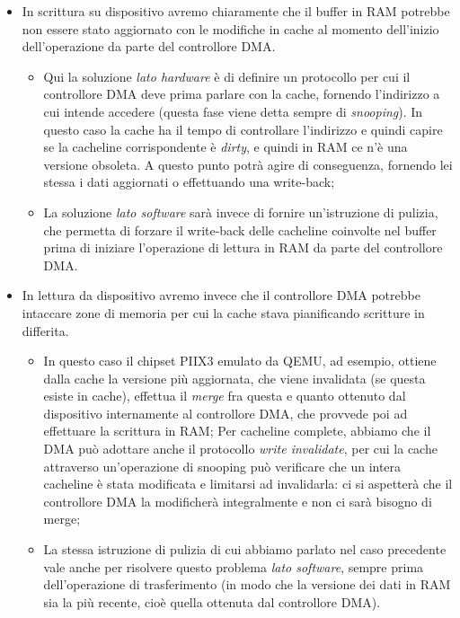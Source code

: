 \documentclass[a4paper,11pt]{article}
\begin{document}
\begin{itemize}
	\item 
		In scrittura su dispositivo avremo chiaramente che il buffer in RAM potrebbe non essere stato aggiornato con le modifiche in cache al momento dell'inizio dell'operazione da parte del controllore DMA.
		\begin{itemize}
			\item Qui la soluzione \textit{lato hardware} è di definire un protocollo per cui il controllore DMA deve prima parlare con la cache, fornendo l'indirizzo a cui intende accedere (questa fase viene detta sempre di \textit{snooping}).
				In questo caso la cache ha il tempo di controllare l'indirizzo e quindi capire se la cacheline corrispondente è \textit{dirty}, e quindi in RAM ce n'è una versione obsoleta.
				A questo punto potrà agire di conseguenza, fornendo lei stessa i dati aggiornati o effettuando una write-back;
			\item La soluzione \textit{lato software} sarà invece di fornire un'istruzione di pulizia, che permetta di forzare il write-back delle cacheline coinvolte nel buffer prima di iniziare l'operazione di lettura in RAM da parte del controllore DMA.
		\end{itemize}
	\item
		In lettura da dispositivo avremo invece che il controllore DMA potrebbe intaccare zone di memoria per cui la cache stava pianificando scritture in differita.
		\begin{itemize}
			\item In questo caso il chipset PIIX3 emulato da QEMU, ad esempio, ottiene dalla cache la versione più aggiornata, che viene invalidata (se questa esiste in cache), effettua il \textit{merge} fra questa e quanto ottenuto dal dispositivo internamente al controllore DMA, che provvede poi ad effettuare la scrittura in RAM;
				Per cacheline complete, abbiamo che il DMA può adottare anche il protocollo \textit{write invalidate}, per cui la cache attraverso un'operazione di snooping può verificare che un intera cacheline è stata modificata e limitarsi ad invalidarla: ci si aspetterà che il controllore DMA la modificherà integralmente e non ci sarà bisogno di merge;
			\item La stessa istruzione di pulizia di cui abbiamo parlato nel caso precedente vale anche per risolvere questo problema \textit{lato software}, sempre prima dell'operazione di trasferimento (in modo che la versione dei dati in RAM sia la più recente, cioè quella ottenuta dal controllore DMA).
		\end{itemize}
\end{itemize}
\end{document}
